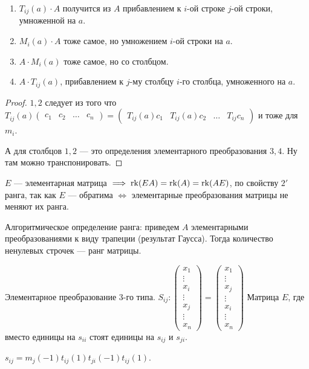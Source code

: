 \begin{statement}
    \begin{enumerate}
        \item $T_{ij}(a) \cdot A$ получится из  $A$ прибавлением к  $i$-ой строке  $j$-ой строки, умноженной на  $a$.
        \item $M_i(a)\cdot A$ тоже самое, но умножением  $i$-ой строки на  $a$.
        \item  $A \cdot M_i(a)$ тоже самое, но со столбцом.
        \item  $A \cdot T_{ij}(a)$, прибавлением к  $j$-му столбцу  $i$-го столбца, умноженного на  $a$.
    \end{enumerate}
\end{statement}
\begin{proof}
    $1, 2$ следует из того что  $T_{ij}(a) \left(\begin{array}{c|c|c|c} c_1 & c_2 & \ldots & c_n \end{array} \right) = \left(\begin{array}{c|c|c|c} T_{ij}(a)c_1 & T_{ij}(a)c_2 & \ldots & T_{ij}c_n \end{array} \right)$ и тоже для $m_i$.

    А для столбцов  $1,2$ --- это определения элементарного преобразования  $3, 4$. Ну там можно транспонировать.
\end{proof}
\begin{remark}
    $E$ --- элементарная матрица  $\implies \operatorname{rk}(EA) = \operatorname{rk}(A) = \operatorname{rk}(AE)$, по свойству  $2'$ ранга, так как  $E$ --- обратима  $\iff$ элементарные преобразования матрицы не меняют их ранга.
\end{remark}
\begin{consequence}
    Алгоритмическое определение ранга: приведем $A$ элементарными преобразованиями к виду трапеции (результат Гаусса). Тогда количество ненулевых строчек --- ранг матрицы.
\end{consequence}
\begin{remark}
    Элементарное преобразование 3-го типа.
    $S_{ij}\!: \begin{pmatrix} x_1 \\ \vdots \\ x_i \\ \vdots \\ x_j \\ \vdots \\x_n \end{pmatrix} = \begin{pmatrix} x_1 \\ \vdots \\ x_j \\ \vdots \\ x_i \\ \vdots \\x_n \end{pmatrix}$
    Матрица $E$, где вместо единицы на  $s_{ii}$ стоят единицы на  $s_{ij}$ и  $s_{ji}$.

    $s_{ij} = m_{j}(-1)t_{ij}(1)t_{ji}(-1)t_{ij}(1)$.
\end{remark}

